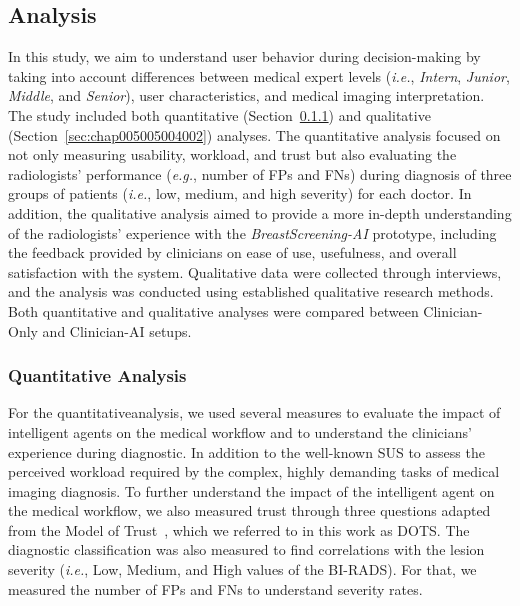 \subsection{Analysis}
\label{sec:chap005005004}

In this study, we aim to understand user behavior during decision-making by taking into account differences between medical expert levels ({\it i.e.}, {\it Intern}, {\it Junior}, {\it Middle}, and {\it Senior}), user characteristics, and medical imaging interpretation.
The study included both quantitative (Section~\ref{sec:chap005005004001}) and qualitative (Section~\ref{sec:chap005005004002}) analyses.
The quantitative analysis focused on not only measuring usability, workload, and trust but also evaluating the radiologists' performance ({\it e.g.}, number of \acp{FP} and \acp{FN}) during diagnosis of three groups of patients ({\it i.e.}, low, medium, and high severity) for each doctor.
In addition, the qualitative analysis aimed to provide a more in-depth understanding of the radiologists' experience with the {\it BreastScreening-AI} prototype, including the feedback provided by clinicians on ease of use, usefulness, and overall satisfaction with the system.
Qualitative data were collected through interviews, and the analysis was conducted using established qualitative research methods.
Both quantitative and qualitative analyses were compared between Clinician-Only and Clinician-AI setups.

\subsubsection{Quantitative Analysis}
\label{sec:chap005005004001}

For the quantitative\footnotemark[13] analysis, we used several measures to evaluate the impact of intelligent agents on the medical workflow and to understand the clinicians' experience during diagnostic.
In addition to the well-known \ac{SUS} to assess the perceived workload required by the complex, highly demanding tasks of medical imaging diagnosis.
To further understand the impact of the intelligent agent on the medical workflow, we also measured trust through three questions adapted from the Model of Trust~\cite{CALISTO2021102607}, which we referred to in this work as \ac{DOTS}. 
The diagnostic classification was also measured to find correlations with the lesion severity ({\it i.e.}, Low, Medium, and High values of the \acs{BI-RADS}).
For that, we measured the number of \acp{FP} and \acp{FN} to understand severity rates.


